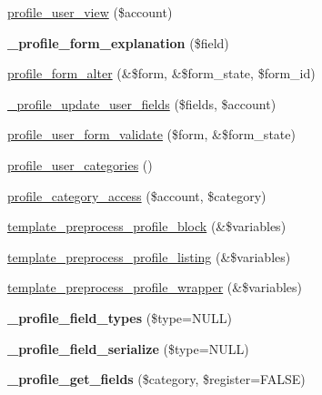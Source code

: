 \begin{DoxyCompactItemize}
\item 
\hyperlink{profile_8module_a41afe6040449cd3066939e034cdd7b57}{profile\_\-user\_\-view} (\$account)
\item 
\hypertarget{profile_8module_a0257a44ad265c9a928a8e182b3850dd7}{
{\bfseries \_\-profile\_\-form\_\-explanation} (\$field)}
\label{profile_8module_a0257a44ad265c9a928a8e182b3850dd7}

\item 
\hyperlink{profile_8module_a1797a78888154f866995232f20ece3e5}{profile\_\-form\_\-alter} (\&\$form, \&\$form\_\-state, \$form\_\-id)
\item 
\hyperlink{profile_8module_a7c8e6c9720f8fddbddb84ae746b448ec}{\_\-profile\_\-update\_\-user\_\-fields} (\$fields, \$account)
\item 
\hyperlink{profile_8module_a7fc102eb762973087f36295f8427df14}{profile\_\-user\_\-form\_\-validate} (\$form, \&\$form\_\-state)
\item 
\hyperlink{profile_8module_ace541ae41831d349df58b346e5945bf1}{profile\_\-user\_\-categories} ()
\item 
\hyperlink{profile_8module_abfe11b7a856c5a19d8e11044609cfdbf}{profile\_\-category\_\-access} (\$account, \$category)
\item 
\hyperlink{profile_8module_ac67229ab98fe8f88094d3db5e7918040}{template\_\-preprocess\_\-profile\_\-block} (\&\$variables)
\item 
\hyperlink{profile_8module_a7dc89cd06dce412d737449102c65c5d5}{template\_\-preprocess\_\-profile\_\-listing} (\&\$variables)
\item 
\hyperlink{profile_8module_af0ca4c9b63d8be38a0c7f354bf94ab6e}{template\_\-preprocess\_\-profile\_\-wrapper} (\&\$variables)
\item 
\hypertarget{profile_8module_a69e82eced76c34486e043a4575fd21bc}{
{\bfseries \_\-profile\_\-field\_\-types} (\$type=NULL)}
\label{profile_8module_a69e82eced76c34486e043a4575fd21bc}

\item 
\hypertarget{profile_8module_a4602bc4d9cb5579bf7a74993ba38c50c}{
{\bfseries \_\-profile\_\-field\_\-serialize} (\$type=NULL)}
\label{profile_8module_a4602bc4d9cb5579bf7a74993ba38c50c}

\item 
\hypertarget{profile_8module_a1770200b5c34f5c3ba4f43bd75f404fc}{
{\bfseries \_\-profile\_\-get\_\-fields} (\$category, \$register=FALSE)}
\label{profile_8module_a1770200b5c34f5c3ba4f43bd75f404fc}

\end{DoxyCompactItemize}


